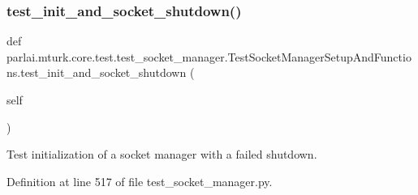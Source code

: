 \subsubsection{\texorpdfstring{test\+\_\+init\+\_\+and\+\_\+socket\+\_\+shutdown()}{test\_init\_and\_socket\_shutdown()}}
{\footnotesize\ttfamily def parlai.\+mturk.\+core.\+test.\+test\+\_\+socket\+\_\+manager.\+Test\+Socket\+Manager\+Setup\+And\+Functions.\+test\+\_\+init\+\_\+and\+\_\+socket\+\_\+shutdown (\begin{DoxyParamCaption}\item[{}]{self }\end{DoxyParamCaption})}

\begin{DoxyVerb}Test initialization of a socket manager with a failed shutdown.
\end{DoxyVerb}
 

Definition at line 517 of file test\+\_\+socket\+\_\+manager.\+py.


